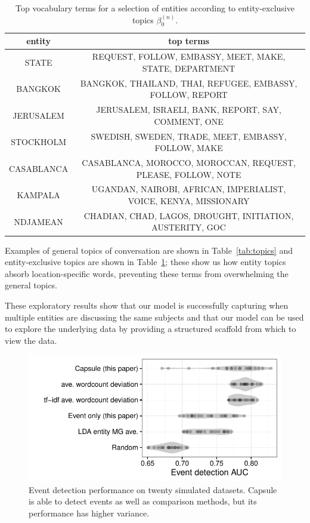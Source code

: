 \begin{table}
\centering
\small
\begin{tabular}{cc}
\toprule
entity & top terms \\
\midrule
STATE & REQUEST, FOLLOW, EMBASSY, MEET, MAKE, STATE, DEPARTMENT \\
BANGKOK & BANGKOK, THAILAND, THAI, REFUGEE, EMBASSY, FOLLOW, REPORT \\
JERUSALEM & JERUSALEM, ISRAELI, BANK, REPORT, SAY, COMMENT, ONE \\
STOCKHOLM & SWEDISH, SWEDEN, TRADE, MEET, EMBASSY, FOLLOW, MAKE \\
CASABLANCA & CASABLANCA, MOROCCO, MOROCCAN, REQUEST, PLEASE, FOLLOW, NOTE \\
KAMPALA & UGANDAN, NAIROBI, AFRICAN, IMPERIALIST, VOICE, KENYA, MISSIONARY \\
NDJAMEAN & CHADIAN, CHAD, LAGOS, DROUGHT, INITIATION, AUSTERITY, GOC \\
\bottomrule
\end{tabular}
\label{tab:entities}
\caption{Top vocabulary terms for a selection of entities according to entity-exclusive topics $\beta^{(n)}_0$.}
\end{table}

Examples of general topics of conversation are shown in Table~\ref{tab:topics} and entity-exclusive topics are shown in Table~\ref{tab:entities}; these show us how entity topics absorb location-specific words, preventing these terms from overwhelming the general topics.  

These exploratory results show that our model is successfully capturing when multiple entities are discussing the same subjects and that our model can be used to explore the underlying data by providing a structured scaffold from which to view the data.


\begin{figure}[h]
\centering
\includegraphics[width=\linewidth]{fig/sim_eventdetect.pdf}
\caption{Event detection performance on twenty simulated datasets.  Capsule is able to detect events as well as comparison methods, but its performance has higher variance.}
\label{fig:sim_eventdetect}
\end{figure}

